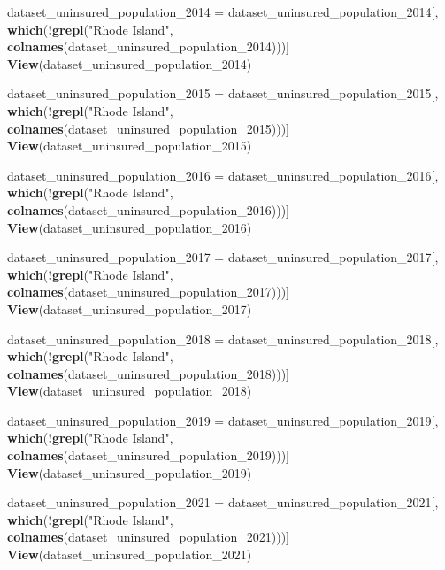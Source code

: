 \documentclass[
]{article}
\newenvironment{Shaded}{\begin{snugshade}}{\end{snugshade}}
\newcommand{\FunctionTok}[1]{\textcolor[rgb]{0.13,0.29,0.53}{\textbf{#1}}}
\newcommand{\NormalTok}[1]{#1}
\newcommand{\OtherTok}[1]{\textcolor[rgb]{0.56,0.35,0.01}{#1}}
\newcommand{\SpecialCharTok}[1]{\textcolor[rgb]{0.81,0.36,0.00}{\textbf{#1}}}
\newcommand{\StringTok}[1]{\textcolor[rgb]{0.31,0.60,0.02}{#1}}
\begin{document}
\begin{Shaded}
\begin{Highlighting}[]
\NormalTok{dataset\_uninsured\_population\_2014 }\OtherTok{=}\NormalTok{ dataset\_uninsured\_population\_2014[, }\FunctionTok{which}\NormalTok{(}\SpecialCharTok{!}\FunctionTok{grepl}\NormalTok{(}\StringTok{"Rhode Island"}\NormalTok{, }\FunctionTok{colnames}\NormalTok{(dataset\_uninsured\_population\_2014)))]}
\FunctionTok{View}\NormalTok{(dataset\_uninsured\_population\_2014)}

\NormalTok{dataset\_uninsured\_population\_2015 }\OtherTok{=}\NormalTok{ dataset\_uninsured\_population\_2015[, }\FunctionTok{which}\NormalTok{(}\SpecialCharTok{!}\FunctionTok{grepl}\NormalTok{(}\StringTok{"Rhode Island"}\NormalTok{, }\FunctionTok{colnames}\NormalTok{(dataset\_uninsured\_population\_2015)))]}
\FunctionTok{View}\NormalTok{(dataset\_uninsured\_population\_2015)}

\NormalTok{dataset\_uninsured\_population\_2016 }\OtherTok{=}\NormalTok{ dataset\_uninsured\_population\_2016[, }\FunctionTok{which}\NormalTok{(}\SpecialCharTok{!}\FunctionTok{grepl}\NormalTok{(}\StringTok{"Rhode Island"}\NormalTok{, }\FunctionTok{colnames}\NormalTok{(dataset\_uninsured\_population\_2016)))]}
\FunctionTok{View}\NormalTok{(dataset\_uninsured\_population\_2016)}

\NormalTok{dataset\_uninsured\_population\_2017 }\OtherTok{=}\NormalTok{ dataset\_uninsured\_population\_2017[, }\FunctionTok{which}\NormalTok{(}\SpecialCharTok{!}\FunctionTok{grepl}\NormalTok{(}\StringTok{"Rhode Island"}\NormalTok{, }\FunctionTok{colnames}\NormalTok{(dataset\_uninsured\_population\_2017)))]}
\FunctionTok{View}\NormalTok{(dataset\_uninsured\_population\_2017)}

\NormalTok{dataset\_uninsured\_population\_2018 }\OtherTok{=}\NormalTok{ dataset\_uninsured\_population\_2018[, }\FunctionTok{which}\NormalTok{(}\SpecialCharTok{!}\FunctionTok{grepl}\NormalTok{(}\StringTok{"Rhode Island"}\NormalTok{, }\FunctionTok{colnames}\NormalTok{(dataset\_uninsured\_population\_2018)))]}
\FunctionTok{View}\NormalTok{(dataset\_uninsured\_population\_2018)}

\NormalTok{dataset\_uninsured\_population\_2019 }\OtherTok{=}\NormalTok{ dataset\_uninsured\_population\_2019[, }\FunctionTok{which}\NormalTok{(}\SpecialCharTok{!}\FunctionTok{grepl}\NormalTok{(}\StringTok{"Rhode Island"}\NormalTok{, }\FunctionTok{colnames}\NormalTok{(dataset\_uninsured\_population\_2019)))]}
\FunctionTok{View}\NormalTok{(dataset\_uninsured\_population\_2019)}

\NormalTok{dataset\_uninsured\_population\_2021 }\OtherTok{=}\NormalTok{ dataset\_uninsured\_population\_2021[, }\FunctionTok{which}\NormalTok{(}\SpecialCharTok{!}\FunctionTok{grepl}\NormalTok{(}\StringTok{"Rhode Island"}\NormalTok{, }\FunctionTok{colnames}\NormalTok{(dataset\_uninsured\_population\_2021)))]}
\FunctionTok{View}\NormalTok{(dataset\_uninsured\_population\_2021)}


\end{Highlighting}
\end{Shaded}
\end{document}
